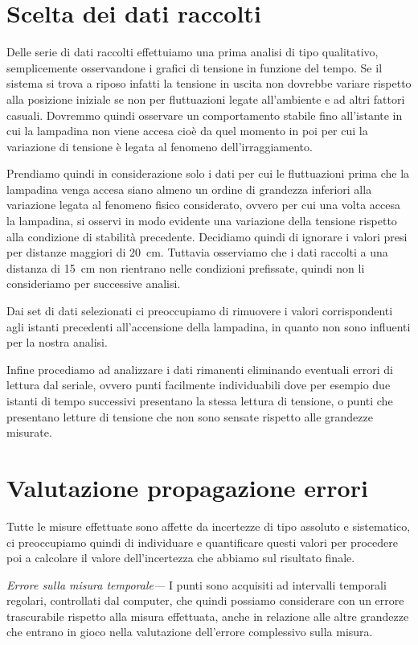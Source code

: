 \documentclass[
    rmp,
    reprint, 
    superscriptaddress, 
    altaffilletter, 
    amsmath, 
    amssymb,
    a4paper]{revtex4-2}
\begin{document}
\section*{Scelta dei dati raccolti}
Delle serie di dati raccolti effettuiamo una prima analisi di tipo qualitativo, semplicemente osservandone i grafici di tensione in funzione del tempo. Se il sistema si trova a riposo infatti la tensione in uscita non dovrebbe variare rispetto alla posizione iniziale se non per fluttuazioni legate all'ambiente e ad altri fattori casuali. Dovremmo quindi osservare un comportamento stabile fino all'istante in cui la lampadina non viene accesa cioè da quel momento in poi per cui la variazione di tensione è legata al fenomeno dell'irraggiamento. 

Prendiamo quindi in considerazione solo i dati per cui le fluttuazioni prima che la lampadina venga accesa siano almeno un ordine di grandezza inferiori alla variazione legata al fenomeno fisico considerato, ovvero per cui una volta accesa la lampadina, si osservi in modo evidente una variazione della tensione rispetto alla condizione di stabilità precedente. Decidiamo quindi di ignorare i valori presi per distanze maggiori di \SI{20}{\centi\metre}. Tuttavia  osserviamo che i dati raccolti a una distanza di \SI{15}{\centi\metre} non rientrano nelle condizioni prefissate, quindi non li consideriamo per successive analisi. 

Dai set di dati selezionati ci preoccupiamo di rimuovere i valori corrispondenti agli istanti precedenti all'accensione della lampadina, in quanto non sono influenti per la nostra analisi.

Infine procediamo ad analizzare i dati rimanenti eliminando eventuali errori di lettura dal seriale, ovvero punti facilmente individuabili dove per esempio due istanti di tempo successivi presentano la stessa lettura di tensione, o punti che presentano letture di tensione che non sono sensate rispetto alle grandezze misurate. 

\section*{Valutazione propagazione errori}

Tutte le misure effettuate sono affette da incertezze di tipo assoluto e sistematico, ci preoccupiamo quindi di individuare e quantificare questi valori per procedere poi a calcolare il valore dell’incertezza che abbiamo sul risultato finale.

\noindent\textit{Errore sulla misura temporale---}
I punti sono acquisiti ad intervalli temporali regolari, controllati dal computer, che quindi possiamo considerare con un errore trascurabile rispetto alla misura effettuata, anche in relazione alle altre grandezze che entrano in gioco nella valutazione dell'errore complessivo sulla misura.
\end{document}
